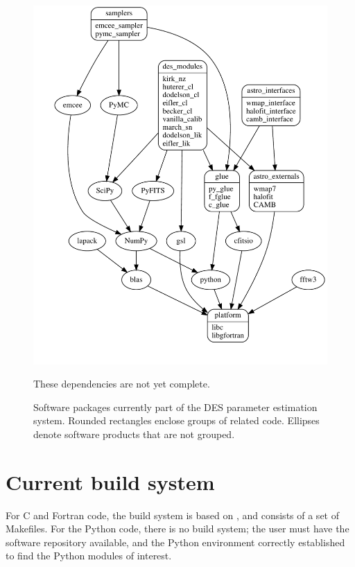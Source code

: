 \documentclass[draftmode,draftwater]{memarticle}
\newcommand{\despipe}{\name{des-pipe}\xspace}
\begin{document}
\begin{figure}
{    \includegraphics[width=\textwidth]{astro_packages}
  }
  \begin{fixme}
    These dependencies are not yet complete.
  \end{fixme}
  \caption{Software packages currently part of the DES parameter
    estimation system. Rounded rectangles enclose groups of related
    code. Ellipses denote software products that are not grouped.}
  \label{fig:astropackages}
\end{figure}


\section{Current build system}

For C and Fortran code, the \despipe build system is based on
, and consists of a set of Makefiles. For the Python code,
there is no build system; the user must have the software repository
available, and the Python environment correctly established to find the
Python modules of interest.
\end{document}
